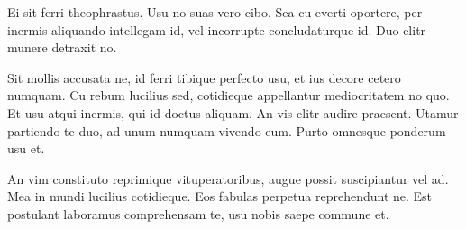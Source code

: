 Ei sit ferri theophrastus. Usu no suas vero cibo. Sea cu everti oportere, per inermis aliquando intellegam id, vel incorrupte concludaturque id. Duo elitr munere detraxit no.

Sit mollis accusata ne, id ferri tibique perfecto usu, et ius decore cetero numquam. Cu rebum lucilius sed, cotidieque appellantur mediocritatem no quo. Et usu atqui inermis, qui id doctus aliquam. An vis elitr audire praesent. Utamur partiendo te duo, ad unum numquam vivendo eum. Purto omnesque ponderum usu et.

An vim constituto reprimique vituperatoribus, augue possit suscipiantur vel ad. Mea in mundi lucilius cotidieque. Eos fabulas perpetua reprehendunt ne. Est postulant laboramus comprehensam te, usu nobis saepe commune et.
